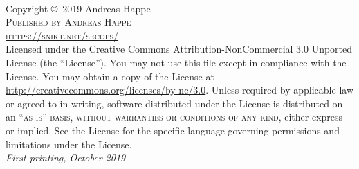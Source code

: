 \documentclass[11pt,fleqn,openany]{book} %
\begin{document}

\begingroup
\thispagestyle{empty} %
\vfill
\endgroup


\newpage
~\vfill
\thispagestyle{empty}

\noindent Copyright \copyright\ 2019 Andreas Happe\\ %

\noindent \textsc{Published by Andreas Happe}\\ %

\noindent \textsc{\url{https://snikt.net/secops/}}\\ %

\noindent Licensed under the Creative Commons Attribution-NonCommercial 3.0 Unported License (the ``License''). You may not use this file except in compliance with the License. You may obtain a copy of the License at \url{http://creativecommons.org/licenses/by-nc/3.0}. Unless required by applicable law or agreed to in writing, software distributed under the License is distributed on an \textsc{``as is'' basis, without warranties or conditions of any kind}, either express or implied. See the License for the specific language governing permissions and limitations under the License.\\ %

\noindent \textit{First printing, October 2019} %
\end{document}

